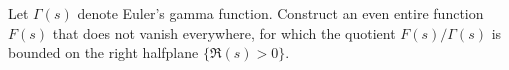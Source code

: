 Let $\Gamma(s)$ denote Euler's gamma function. Construct an even entire function $F(s)$ that does not vanish everywhere, for which the quotient $F(s)/\Gamma(s)$ is bounded on the right halfplane $\{\Re(s)>0\}$.